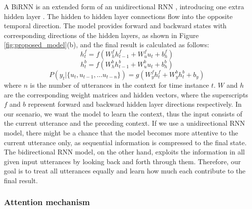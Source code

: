 \documentclass[a4paper]{article}
\begin{document}
A BiRNN is an extended form of an unidirectional RNN \cite{elman1990finding}, introducing one extra hidden layer \cite{GravesBiRnn,SchusterBiRnn}. The hidden to hidden layer connections flow into the opposite temporal direction. 
The model provides forward and backward states with corresponding directions of the hidden layers, as shown in Figure \ref{fig:proposed_model}(b), and the final result is calculated as follows:
\begin{equation}
h_{t}^{f}  = f\left(W_{h}^{f}h_{t-1}^{f}+W_{u}^{f}u_{t} + b_{h}^{f}\right)
\end{equation} 
\begin{equation}
h_{t}^{b}  = f\left(W_{h}^{b}h_{t-1}^{b}+W_{u}^{b}u_{t} + b_{h}^{b}\right)
\end{equation} 
\begin{equation}
P(y_{t} | \{u_{t}, u_{t-1},...u_{t-n}\}) = g\left(W_{y}^{f}h_{t}^{f} + W_{y}^{b}h_{t}^{b} + b_{y}\right)
\end{equation} 
where $n$ is the number of utterances in the context for time instance $t$.
$W$ and $h$ are the corresponding weight matrices and hidden vectors, where the superscripts $f$ and $b$ represent forward and backward hidden layer directions respectively. 
In our scenario, we want the model to learn the context, thus the input consists of the current utterance and the preceding context. If we use a unidirectional RNN model, there might be a chance that the model becomes more attentive to the current utterance only, as sequential information is compressed to the final state.
The bidirectional RNN model, on the other hand, exploits the information in all given input utterances by looking back and forth through them. 
Therefore, our goal is to treat all utterances equally and learn how much each contribute to the final result. 


\subsubsection{Attention mechanism}
\label{sec:utt_att}
\end{document}
